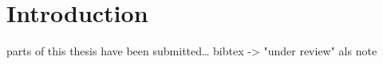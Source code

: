 
\chapter{Introduction}\label{chapter:introduction}
parts of this thesis have been submitted\dots
bibtex -> "under review" als note
